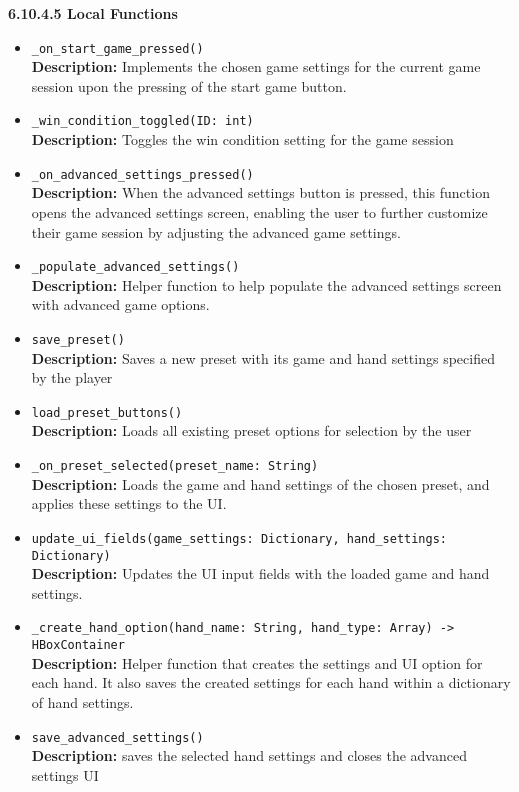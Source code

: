 \documentclass[12pt, titlepage]{article}
\begin{document}
\textbf{6.10.4.5 Local Functions}
\begin{itemize}
    \item \texttt{\_on\_start\_game\_pressed() }\\
	\textbf{Description:} Implements the chosen game settings for the current game session upon the pressing of the start game button. 
	\item \texttt{\_win\_condition\_toggled(ID: int) }\\
	\textbf{Description:} Toggles the win condition setting for the game session
	\item \texttt{\_on\_advanced\_settings\_pressed() }\\
	\textbf{Description:} When the advanced settings button is pressed, this function opens the advanced settings screen, enabling the user to further customize their game session by adjusting the advanced game settings.
	\item \texttt{\_populate\_advanced\_settings() }\\
	\textbf{Description:} Helper function to help populate the advanced settings screen with advanced game options.
	\item \texttt{save\_preset() }\\
	\textbf{Description:} Saves a new preset with its game and hand settings specified by the player
	\item \texttt{load\_preset\_buttons()}\\
	\textbf{Description:} Loads all existing preset options for selection by the user
	\item \texttt{\_on\_preset\_selected(preset\_name: String)}\\
	\textbf{Description:} Loads the game and hand settings of the chosen preset, and applies these settings to the UI.
	\item \texttt{update\_ui\_fields(game\_settings: Dictionary, hand\_settings: Dictionary) }\\
	\textbf{Description:} Updates the UI input fields with the loaded game and hand settings.
	\item \texttt{\_create\_hand\_option(hand\_name: String, hand\_type: Array) -> HBoxContainer }\\
	\textbf{Description:} Helper function that creates the settings and UI option for each hand. It also saves the created settings for each hand within a dictionary of hand settings.
	\item \texttt{save\_advanced\_settings() }\\
	\textbf{Description:} saves the selected hand settings and closes the advanced settings UI

\end{itemize}
\end{document}
